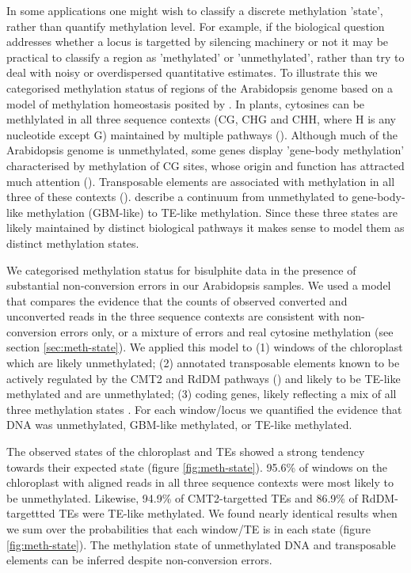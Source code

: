\documentclass[12pt,longbibliography]{article}
\begin{document}
In some applications one might wish to classify a discrete methylation 'state', rather than quantify methylation level.
For example, if the biological question addresses whether a locus is targetted by silencing machinery or not it may be practical to classify a region as 'methylated' or 'unmethylated', rather than try to deal with noisy or overdispersed quantitative estimates.
To illustrate this we categorised methylation status of regions of the Arabidopsis genome based on a model of methylation homeostasis posited by \textcite{zhang2020natural}.
In plants, cytosines can be methlylated in all three sequence contexts (CG, CHG and CHH, where H is any nucleotide except G) maintained by multiple pathways (\cite{law2010establishing}).
Although much of the Arabidopsis genome is unmethylated, some genes display 'gene-body methylation' characterised by methylation of CG sites, whose origin and function has attracted much attention (\cite{muyle2022gene}). 
Transposable elements are associated with methylation in all three of these contexts (\cite{cokus2008shotgun, lister2008highly}).
\textcite{zhang2020natural} describe a continuum from unmethylated to gene-body-like methylation (GBM-like) to TE-like methylation.
Since these three states are likely maintained by distinct biological pathways it makes sense to model them as distinct methylation states.

We categorised methylation status for bisulphite data in the presence of substantial non-conversion errors in our Arabidopsis samples.
We used a model that compares the evidence that the counts of observed converted and unconverted reads in the three sequence contexts are consistent with non-conversion errors only, or a mixture of errors and real cytosine methylation (see section \ref{sec:meth-state}).
We applied this model to (1) windows of the chloroplast which are likely unmethylated; (2) annotated transposable elements known to be actively regulated by the CMT2 and RdDM pathways (\cite{stroud2013comprehensive}) and likely to be TE-like methylated and are unmethylated; (3) coding genes, likely reflecting a mix of all three methylation states \parencite{zhang2020natural}.
For each window/locus we quantified the evidence that DNA was unmethylated, GBM-like methylated, or TE-like methylated.

The observed states of the chloroplast and TEs showed a strong tendency towards their expected state (figure \ref{fig:meth-state}).
95.6\% of windows on the chloroplast with aligned reads in all three sequence contexts were most likely to be unmethylated.
Likewise, 94.9\% of CMT2-targetted TEs and 86.9\% of RdDM-targettted TEs were TE-like methylated.
We found nearly identical results when we sum over the probabilities that each window/TE is in each state (figure \ref{fig:meth-state}).
The methylation state of unmethylated DNA and transposable elements can be inferred despite non-conversion errors.
\end{document}
